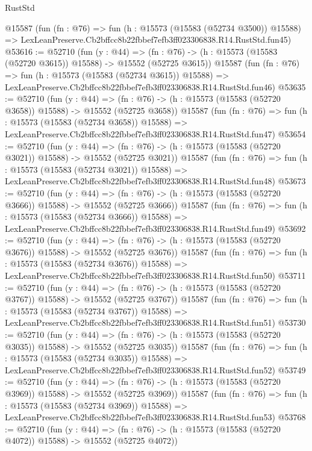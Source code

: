 \begin{lexlean}{RustStd}
\begin{coremodule}
    @15587
    (fun (fn : @76) =>
    fun (h : @15573 (@15583 (@52734 @3500)) @15588) =>
    LexLeanPreserve.Cb2bffcc8b22fbbef7efb3ff023306838.R14.RustStd.fun45)
@53616 := @52710
    (fun (y : @44) =>
    (fn : @76) -> (h : @15573 (@15583 (@52720 @3615)) @15588) -> @15552 (@52725 @3615))
    @15587
    (fun (fn : @76) =>
    fun (h : @15573 (@15583 (@52734 @3615)) @15588) =>
    LexLeanPreserve.Cb2bffcc8b22fbbef7efb3ff023306838.R14.RustStd.fun46)
@53635 := @52710
    (fun (y : @44) =>
    (fn : @76) -> (h : @15573 (@15583 (@52720 @3658)) @15588) -> @15552 (@52725 @3658))
    @15587
    (fun (fn : @76) =>
    fun (h : @15573 (@15583 (@52734 @3658)) @15588) =>
    LexLeanPreserve.Cb2bffcc8b22fbbef7efb3ff023306838.R14.RustStd.fun47)
@53654 := @52710
    (fun (y : @44) =>
    (fn : @76) -> (h : @15573 (@15583 (@52720 @3021)) @15588) -> @15552 (@52725 @3021))
    @15587
    (fun (fn : @76) =>
    fun (h : @15573 (@15583 (@52734 @3021)) @15588) =>
    LexLeanPreserve.Cb2bffcc8b22fbbef7efb3ff023306838.R14.RustStd.fun48)
@53673 := @52710
    (fun (y : @44) =>
    (fn : @76) -> (h : @15573 (@15583 (@52720 @3666)) @15588) -> @15552 (@52725 @3666))
    @15587
    (fun (fn : @76) =>
    fun (h : @15573 (@15583 (@52734 @3666)) @15588) =>
    LexLeanPreserve.Cb2bffcc8b22fbbef7efb3ff023306838.R14.RustStd.fun49)
@53692 := @52710
    (fun (y : @44) =>
    (fn : @76) -> (h : @15573 (@15583 (@52720 @3676)) @15588) -> @15552 (@52725 @3676))
    @15587
    (fun (fn : @76) =>
    fun (h : @15573 (@15583 (@52734 @3676)) @15588) =>
    LexLeanPreserve.Cb2bffcc8b22fbbef7efb3ff023306838.R14.RustStd.fun50)
@53711 := @52710
    (fun (y : @44) =>
    (fn : @76) -> (h : @15573 (@15583 (@52720 @3767)) @15588) -> @15552 (@52725 @3767))
    @15587
    (fun (fn : @76) =>
    fun (h : @15573 (@15583 (@52734 @3767)) @15588) =>
    LexLeanPreserve.Cb2bffcc8b22fbbef7efb3ff023306838.R14.RustStd.fun51)
@53730 := @52710
    (fun (y : @44) =>
    (fn : @76) -> (h : @15573 (@15583 (@52720 @3035)) @15588) -> @15552 (@52725 @3035))
    @15587
    (fun (fn : @76) =>
    fun (h : @15573 (@15583 (@52734 @3035)) @15588) =>
    LexLeanPreserve.Cb2bffcc8b22fbbef7efb3ff023306838.R14.RustStd.fun52)
@53749 := @52710
    (fun (y : @44) =>
    (fn : @76) -> (h : @15573 (@15583 (@52720 @3969)) @15588) -> @15552 (@52725 @3969))
    @15587
    (fun (fn : @76) =>
    fun (h : @15573 (@15583 (@52734 @3969)) @15588) =>
    LexLeanPreserve.Cb2bffcc8b22fbbef7efb3ff023306838.R14.RustStd.fun53)
@53768 := @52710
    (fun (y : @44) =>
    (fn : @76) -> (h : @15573 (@15583 (@52720 @4072)) @15588) -> @15552 (@52725 @4072))

\end{coremodule}
\end{lexlean}
